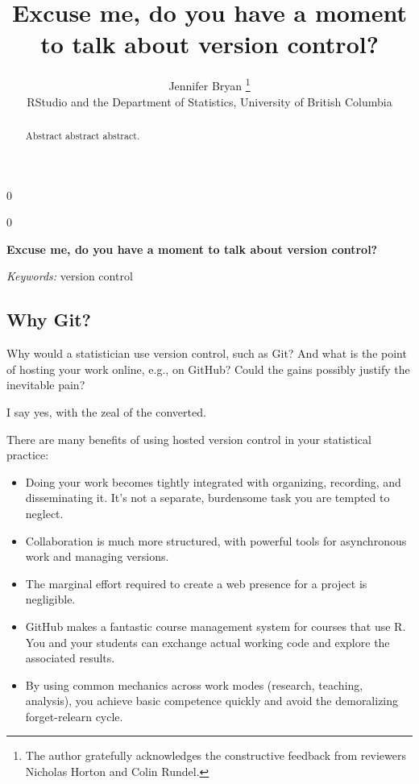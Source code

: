 \documentclass[12pt]{article}
\providecommand{\tightlist}{%
  \setlength{\itemsep}{0pt}\setlength{\parskip}{0pt}}
\newcommand{\blind}{0}
\begin{document}
\def\spacingset#1{\renewcommand{\baselinestretch}%
{#1}\small\normalsize} \spacingset{1}



\blind
{
  \title{\bf Excuse me, do you have a moment to talk about version control?}

  \author{
        Jennifer Bryan \thanks{The author gratefully acknowledges the constructive feedback from
reviewers Nicholas Horton and Colin Rundel.} \\
    RStudio and the Department of Statistics, University of British Columbia\\
      }
  \maketitle
} \fi

\blind
{
  \bigskip
  \bigskip
  \bigskip
  \begin{center}
    {\LARGE\bf Excuse me, do you have a moment to talk about version control?}
  \end{center}
  \medskip
} \fi

\bigskip
\begin{abstract}
Abstract abstract abstract.
\end{abstract}

\noindent%
{\it Keywords:} version control
\vfill

\newpage
\spacingset{1.45} %

\subsection{Why Git?}\label{why-git}

Why would a statistician use version control, such as Git? And what is
the point of hosting your work online, e.g., on GitHub? Could the gains
possibly justify the inevitable pain?

I say yes, with the zeal of the converted.

There are many benefits of using hosted version control in your
statistical practice:

\begin{itemize}
\tightlist
\item
  Doing your work becomes tightly integrated with organizing, recording,
  and disseminating it. It's not a separate, burdensome task you are
  tempted to neglect.
\item
  Collaboration is much more structured, with powerful tools for
  asynchronous work and managing versions.
\item
  The marginal effort required to create a web presence for a project is
  negligible.
\item
  GitHub makes a fantastic course management system for courses that use
  R. You and your students can exchange actual working code and explore
  the associated results.
\item
  By using common mechanics across work modes (research, teaching,
  analysis), you achieve basic competence quickly and avoid the
  demoralizing forget-relearn cycle.
\end{itemize}
\end{document}
